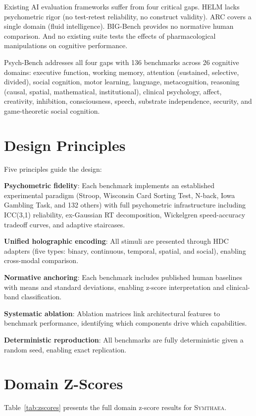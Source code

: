 \documentclass[12pt]{book}
\newcommand{\symthaea}{\textsc{Symthaea}}
\begin{document}
Existing AI evaluation frameworks suffer from four critical gaps. HELM lacks psychometric rigor (no test-retest reliability, no construct validity). ARC covers a single domain (fluid intelligence). BIG-Bench provides no normative human comparison. And no existing suite tests the effects of pharmacological manipulations on cognitive performance.

Psych-Bench addresses all four gaps with 136 benchmarks across 26 cognitive domains: executive function, working memory, attention (sustained, selective, divided), social cognition, motor learning, language, metacognition, reasoning (causal, spatial, mathematical, institutional), clinical psychology, affect, creativity, inhibition, consciousness, speech, substrate independence, security, and game-theoretic social cognition.

\section{Design Principles}

Five principles guide the design:

\textbf{Psychometric fidelity}: Each benchmark implements an established experimental paradigm (Stroop, Wisconsin Card Sorting Test, N-back, Iowa Gambling Task, and 132 others) with full psychometric infrastructure including ICC(3,1) reliability, ex-Gaussian RT decomposition, Wickelgren speed-accuracy tradeoff curves, and adaptive staircases.

\textbf{Unified holographic encoding}: All stimuli are presented through HDC adapters (five types: binary, continuous, temporal, spatial, and social), enabling cross-modal comparison.

\textbf{Normative anchoring}: Each benchmark includes published human baselines with means and standard deviations, enabling z-score interpretation and clinical-band classification.

\textbf{Systematic ablation}: Ablation matrices link architectural features to benchmark performance, identifying which components drive which capabilities.

\textbf{Deterministic reproduction}: All benchmarks are fully deterministic given a random seed, enabling exact replication.

\section{Domain Z-Scores}

Table~\ref{tab:zscores} presents the full domain z-score results for \symthaea{}.
\end{document}
